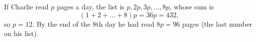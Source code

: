If Charlie read $p$ pages a day, the list is $p,2p,3p,\dots,8p$, whose sum is
\[
(1+2+\dots+8)p=36p=432,
\]
so $p=12$. By the end of the $8$th day he had read $8p=\boxed{96}$ pages (the last number on his list).
